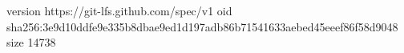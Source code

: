 version https://git-lfs.github.com/spec/v1
oid sha256:3e9d10ddfe9e335b8dbae9ed1d197adb86b71541633aebed45eeef86f58d9048
size 14738
